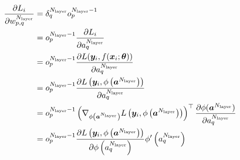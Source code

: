 \documentclass[12pt]{jarticle}
\numberwithin{equation}{section}    %
\numberwithin{figure}{section}      %
\numberwithin{table}{section}      %
\begin{document}
\begin{align}
    \frac{\partial L_{i}}{\partial w_{p, q}^{N_{\text{layer}}}} & = \delta_{q}^{N_{\text{layer}}} o_{p}^{N_{\text{layer}} - 1}                                                                                                                                                                                                                                                           \\
                                                                                  & = o_{p}^{N_{\text{layer}} - 1} \frac{\partial L_{i}}{\partial a_{q}^{N_{\text{layer}}}}                                                                                                                                                                                                                                \\
                                                                                  & = o_{p}^{N_{\text{layer}} - 1} \frac{\partial L(\bm{y}_{i}, f(\bm{x}_{i}; \bm{\theta}))}{\partial a_{q}^{N_{\text{layer}}}}                                                                                                                              \\
                                                                                  & = o_{p}^{N_{\text{layer}} - 1} \frac{\partial L\left(\bm{y}_{i}, \phi\left(\bm{a}^{N_{\text{layer}}}\right)\right)}{\partial a_{q}^{N_{\text{layer}}}}                                                                                                                       \\
                                                                                  & = o_{p}^{N_{\text{layer}} - 1} \left(\nabla_{\phi\left(\bm{a}^{N_{\text{layer}}}\right)} L\left(\bm{y}_{i}, \phi\left(\bm{a}^{N_{\text{layer}}}\right)\right)\right)^\top \frac{\partial \phi(\bm{a}^{N_{\text{layer}}})}{\partial a_{q}^{N_{\text{layer}}}} \\
                                                                                  & = o_{p}^{N_{\text{layer}} - 1} \frac{\partial L\left(\bm{y}_{i}, \phi\left(\bm{a}^{N_{\text{layer}}}\right)\right)}{\partial \phi\left(a_{q}^{N_{\text{layer}}}\right)} \phi'\left(a_{q}^{N_{\text{layer}}}\right)
\end{align}
\end{document}
